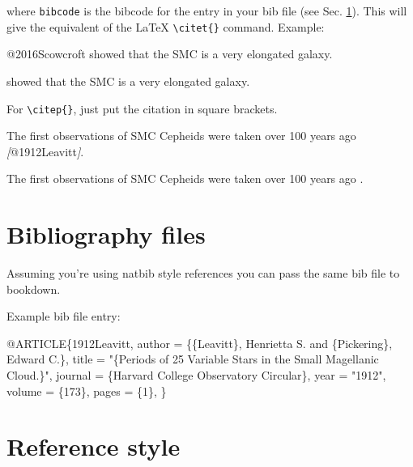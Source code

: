 \documentclass[
]{book}
\newenvironment{Shaded}{\begin{snugshade}}{\end{snugshade}}
\newcommand{\CommentTok}[1]{\textcolor[rgb]{0.56,0.35,0.01}{\textit{#1}}}
\newcommand{\NormalTok}[1]{#1}
\newcommand{\OtherTok}[1]{\textcolor[rgb]{0.56,0.35,0.01}{#1}}
\begin{document}
where \texttt{bibcode} is the bibcode for the entry in your bib file (see Sec. \ref{sec:bib-files}). This will give the equivalent of the LaTeX \texttt{\textbackslash{}citet\{\}} command.
Example:

\begin{Shaded}
\begin{Highlighting}[]
\NormalTok{@2016Scowcroft showed that the SMC is a very elongated galaxy.}
\end{Highlighting}
\end{Shaded}

\citet{2016Scowcroft} showed that the SMC is a very elongated galaxy.

For \texttt{\textbackslash{}citep\{\}}, just put the citation in square brackets.

\begin{Shaded}
\begin{Highlighting}[]
\NormalTok{The first observations of SMC Cepheids were taken over 100 years ago }\CommentTok{[}\OtherTok{@1912Leavitt}\CommentTok{]}\NormalTok{.}
\end{Highlighting}
\end{Shaded}

The first observations of SMC Cepheids were taken over 100 years ago \citep{1912Leavitt}.

\section{Bibliography files}\label{sec:bib-files}

Assuming you're using natbib style references you can pass the same bib file to bookdown.

Example bib file entry:

\begin{Shaded}
\begin{Highlighting}[]
\NormalTok{@ARTICLE\{1912Leavitt,}
\NormalTok{       author = \{\{Leavitt\}, Henrietta S. and \{Pickering\}, Edward C.\},}
\NormalTok{        title = "\{Periods of 25 Variable Stars in the Small Magellanic Cloud.\}",}
\NormalTok{      journal = \{Harvard College Observatory Circular\},}
\NormalTok{         year = "1912",}
\NormalTok{       volume = \{173\},}
\NormalTok{        pages = \{1\},}
\NormalTok{\}}
\end{Highlighting}
\end{Shaded}

\section{Reference style}\label{sec:ref-style}
\end{document}
